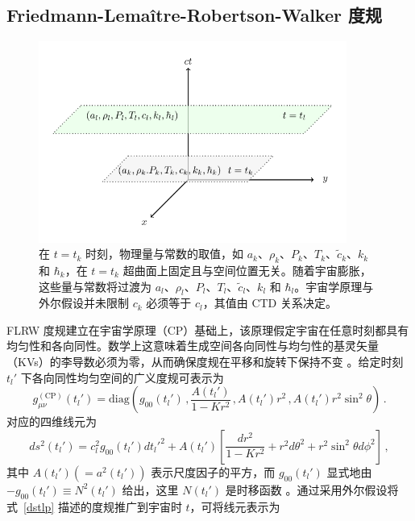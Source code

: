 \documentclass[jkps,preprint,fleqn]{revtex4}
\newcommand{\tc}{\tilde{c}}
\begin{document}
\begin{CJK*}{UTF8}{gbsn}
\section{Friedmann-Lemaître-Robertson-Walker 度规}
\label{sec:RWm}
\begin{figure}
	\begin{center}
	\includegraphics[width=0.9\textwidth]{Fig1.pdf}
	\caption{在 $t = t_k$ 时刻，物理量与常数的取值，如 $a_k$、$\rho_k$、$P_k$、$T_k$、$\tc_k$、$k_{k}$ 和 $\hbar_k$，在 $t=t_k$ 超曲面上固定且与空间位置无关。随着宇宙膨胀，这些量与常数将过渡为 $a_l$、$\rho_l$、$P_l$、$T_l$、$\tc_l$、$k_l$ 和 $\hbar_l$。宇宙学原理与外尔假设并未限制 $c_k$ 必须等于 $c_l$，其值由 CTD 关系决定。}
	\label{Fig1}
	\end{center}
\end{figure}
FLRW 度规建立在宇宙学原理（CP）基础上，该原理假定宇宙在任意时刻都具有均匀性和各向同性。数学上这意味着生成空间各向同性与均匀性的基灵矢量（KVs）的李导数必须为零，从而确保度规在平移和旋转下保持不变 \cite{Lee:2024mal,Ryder09}。给定时刻 $t_l'$ 下各向同性均匀空间的广义度规可表示为
\begin{equation}
g_{\mu\nu}^{(\text{CP})}(t_l') = \text{diag} \left( g_{00}(t_l') \,,  \frac{A(t_l')}{1-Kr^2} \,,  A(t_l') r^2 \,,  A(t_l') r^2 \sin^2 \theta \right) \,.
\end{equation}
对应的四维线元为
\begin{equation}
ds^2(t_l') = c_l^2 g_{00}(t_l') dt_l'^2 + A(t_l') \left[ \frac{dr^2}{1-Kr^2} + r^2 d \theta^2 + r^2 \sin^2 \theta d \phi^2 \right] \label{dstlp} \,,
\end{equation}
其中 $A(t_l') (= a^2(t_l'))$ 表示尺度因子的平方，而 $g_{00}(t_l')$ 显式地由 $- g_{00}(t_l') \equiv N^2(t_l')$ 给出，这里 $N(t_l')$ 是时移函数 \cite{Lee:2024zcu,Ryder09}。通过采用外尔假设将式~\eqref{dstlp} 描述的度规推广到宇宙时 $t$，可将线元表示为

\end{CJK*}
\end{document}
